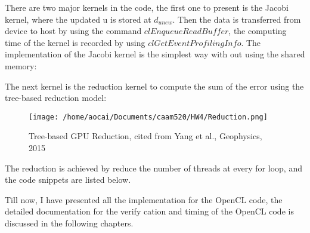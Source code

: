 \documentclass[12pt]{article}
\begin{document}
There are two major kernels in the code, the first one to present is the Jacobi kernel, where the updated u is stored at $d_{unew}$. Then the data is transferred from device to host by using the command $clEnqueueReadBuffer$, the computing time of the kernel is recorded by using $clGetEventProfilingInfo$. The implementation of the Jacobi kernel is the simplest way with out using the shared memory:



The next kernel is the reduction kernel to compute the sum of the error using the tree-based reduction model:
\begin{figure}[H]
	\centering
	\texttt{[image: /home/aocai/Documents/caam520/HW4/Reduction.png]}
	\caption[Optional caption]{Tree-based GPU Reduction, cited from Yang et al., Geophysics, 2015}
	\label{fig:Reduction}
\end{figure} 
The reduction is achieved by reduce the number of threads at every for loop, and the code snippets are listed below.


Till now, I have presented all the implementation for the OpenCL code, the detailed documentation for the verify cation and timing of the OpenCL code is discussed in the following chapters.
\end{document}
